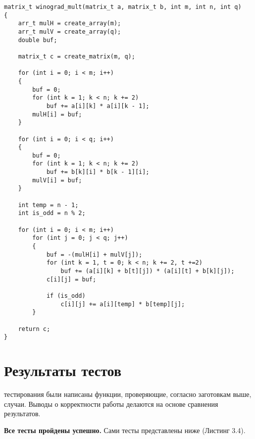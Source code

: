 \begin{lstlisting}[label=code, caption = Оптимизированный алгоритм Винограда]
matrix_t winograd_mult(matrix_t a, matrix_t b, int m, int n, int q)
{
	arr_t mulH = create_array(m);
	arr_t mulV = create_array(q);
	double buf;
	
	matrix_t c = create_matrix(m, q);
	
	for (int i = 0; i < m; i++)
	{
		buf = 0;
		for (int k = 1; k < n; k += 2)
			buf += a[i][k] * a[i][k - 1];
		mulH[i] = buf;
	}
	
	for (int i = 0; i < q; i++)
	{
		buf = 0;
		for (int k = 1; k < n; k += 2)
			buf += b[k][i] * b[k - 1][i];
		mulV[i] = buf;
	}
	
	int temp = n - 1;
	int is_odd = n % 2;
	
	for (int i = 0; i < m; i++)
		for (int j = 0; j < q; j++)
		{
			buf = -(mulH[i] + mulV[j]);
			for (int k = 1, t = 0; k < n; k += 2, t +=2)
				buf += (a[i][k] + b[t][j]) * (a[i][t] + b[k][j]);
			c[i][j] = buf;
			
			if (is_odd)
				c[i][j] += a[i][temp] * b[temp][j];
		}
	
	return c;
}
\end{lstlisting}

\section{Результаты тестов}
 тестирования были написаны функции, проверяющие, согласно заготовкам выше, случаи. Выводы о корректности работы делаются на основе сравнения результатов.

\textbf{Все тесты пройдены успешно.} Сами тесты представлены ниже (Листинг 3.4).\\

